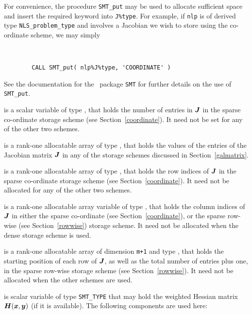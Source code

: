 \documentclass{galahad}
\newcommand{\packagename}{NLS}
\begin{document}
\begin{description}
\begin{description}
For convenience, the procedure {\tt SMT\_put}
may be used to allocate sufficient space and insert the required keyword
into {\tt J\%type}.
For example, if {\tt nlp} is of derived type {\tt \packagename\_problem\_type}
and involves a Jacobian we wish to store using the co-ordinate scheme,
we may simply
{\tt
\begin{verbatim}
        CALL SMT_put( nlp%J%type, 'COORDINATE' )
\end{verbatim}
}
\noindent
See the documentation for the \galahad\ package {\tt SMT}
for further details on the use of {\tt SMT\_put}.

 is a scalar variable of type \integer, that
holds the number of entries in ${\bm{J}}$
in the sparse co-ordinate storage scheme (see Section~\ref{coordinate}).
It need not be set for any of the other two schemes.

 is a rank-one allocatable array of type \realdp, that holds
the values of the entries of the Jacobian matrix ${\bm{J}}$ in any of the
storage schemes discussed in Section~\ref{galmatrix}.

 is a rank-one allocatable array of type \integer,
that holds the row indices of ${\bm{J}}$ in the sparse co-ordinate storage
scheme (see Section~\ref{coordinate}).
It need not be allocated for any of the other two schemes.

 is a rank-one allocatable array variable of type \integer,
that holds the column indices of ${\bm{J}}$ in either the sparse co-ordinate
(see Section~\ref{coordinate}), or the sparse row-wise
(see Section~\ref{rowwise}) storage scheme.
It need not be allocated when the dense storage scheme is used.

 is a rank-one allocatable array of dimension {\tt m+1} and type
\integer, that holds the starting position of each row of ${\bm{J}}$, as well
as the total number of entries plus one, in the sparse row-wise storage
scheme (see Section~\ref{rowwise}). It need not be allocated when the
other schemes are used.

\end{description}

 is scalar variable of type {\tt SMT\_TYPE} that may hold the
weighted Hessian matrix ${\bm{H}}({\bm{x}},{\bm{y}})$ (if it is available).
The following components are used here:

\begin{description}


\end{description}
\end{description}
\end{document}
